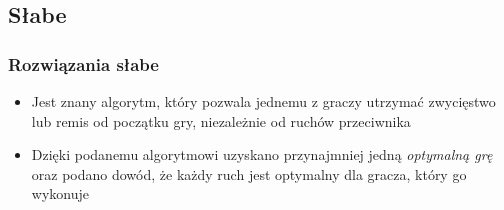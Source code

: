 \documentclass[polish,envcountsect,10pt]{beamer}
\begin{document}
            \subsection{Słabe}
            \begin{frame}
                \frametitle{Rozwiązania słabe}
                \begin{itemize}
                    \item<1-> Jest znany algorytm, który pozwala jednemu z graczy utrzymać zwycięstwo lub remis od początku gry, niezależnie od ruchów przeciwnika
                    \item<2-> Dzięki podanemu algorytmowi uzyskano przynajmniej jedną \textit{optymalną grę} oraz podano dowód, że każdy ruch jest optymalny dla gracza, który go wykonuje                    
                \end{itemize}     
            \end{frame}
\end{document}
